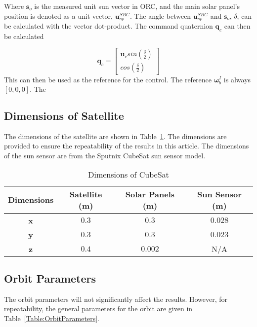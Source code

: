 \documentclass[letterpaper, 10 pt, conference]{ieeeconf}  %
\begin{document}
Where $\mathbf{s}_o$ is the measured unit sun vector in ORC, and the main solar panel's position is denoted as a unit vector, $\mathbf{u}_{sp}^{SBC}$. The angle between $\mathbf{u}_{sp}^{SBC}$ and $\mathbf{s}_o$, $\delta$, can be calculated with the vector dot-product. The command quaternion $\mathbf{q}_c$ can then be calculated

\begin{equation}
\mathbf{q}_c = \begin{bmatrix}
\mathbf{u}_c sin(\frac{\delta}{2}) \\
cos(\frac{\delta}{2})
\end{bmatrix}
\end{equation}
This can then be used as the reference for the control. The reference $\boldsymbol{\omega}_b^I$ is always $[0, 0, 0]$. The 

\subsection{Dimensions of Satellite}
The dimensions of the satellite are shown in Table~\ref{Table:Dimensions}. The dimensions are provided to ensure the repeatability of the results in this article. The dimensions of the sun sensor are from the Sputnix CubeSat sun sensor model.

\begin{table}[!htb]
	\caption{\label{Table:Dimensions}Dimensions of CubeSat}
	\begin{tabular}{|c|c|c|c|}
		\hline
		\textbf{Dimensions} & \textbf{Satellite (m)} & \textbf{Solar Panels (m)} & \textbf{Sun Sensor (m)} \\ \hline
		\textbf{x}          & $0.3$                    & $0.3$                       & $0.028$                   \\ \hline
		\textbf{y}          & $0.3$                    & $0.3$                       & $0.023$                   \\ \hline
		\textbf{z}          & $0.4$                    & $0.002$                     & N/A                     \\ \hline
	\end{tabular}
\end{table}


\subsection{Orbit Parameters}
The orbit parameters will not significantly affect the results. However, for repeatability, the general parameters for the orbit are given in Table~\ref{Table:OrbitParameters}. 
\end{document}
